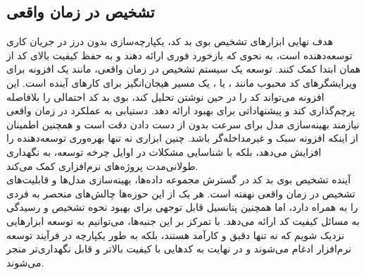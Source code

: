 \subsection{تشخیص در زمان واقعی}

هدف نهایی ابزارهای تشخیص بوی بد کد، یکپارچه‌سازی بدون درز در جریان کاری توسعه‌دهنده است، به نحوی که بازخورد فوری ارائه دهند و به حفظ کیفیت بالای کد از همان ابتدا کمک کنند. توسعه یک سیستم تشخیص در زمان واقعی، مانند یک افزونه برای ویرایشگرهای کد محبوب مانند ،  یا ، یک مسیر هیجان‌انگیز برای کارهای آینده است. این افزونه می‌تواند کد را در حین نوشتن تحلیل کند، بوی بد کد احتمالی را بلافاصله پرچم‌گذاری کند و پیشنهاداتی برای بهبود ارائه دهد. دستیابی به عملکرد در زمان واقعی نیازمند بهینه‌سازی مدل برای سرعت بدون از دست دادن دقت است و همچنین اطمینان از اینکه افزونه سبک و غیرمداخله‌گر باشد. چنین ابزاری نه تنها بهره‌وری توسعه‌دهنده را افزایش می‌دهد، بلکه با شناسایی مشکلات در اوایل چرخه توسعه، به نگهداری طولانی‌مدت پروژه‌های نرم‌افزاری کمک می‌کند.
\\
آینده تشخیص بوی بد کد در گسترش مجموعه داده‌ها، بهینه‌سازی مدل‌ها و قابلیت‌های تشخیص در زمان واقعی نهفته است. هر یک از این حوزه‌ها چالش‌های منحصر به فردی را به همراه دارد، اما همچنین پتانسیل قابل توجهی برای بهبود نحوه تشخیص و رسیدگی به مسائل کیفیت کد ارائه می‌دهد. با تمرکز بر این جنبه‌ها، می‌توانیم به توسعه ابزارهایی نزدیک شویم که نه تنها دقیق و کارآمد هستند، بلکه به طور یکپارچه در فرآیند توسعه نرم‌افزار ادغام می‌شوند و در نهایت به کدهایی با کیفیت بالاتر و قابل نگهداری‌تر منجر می‌شوند.
